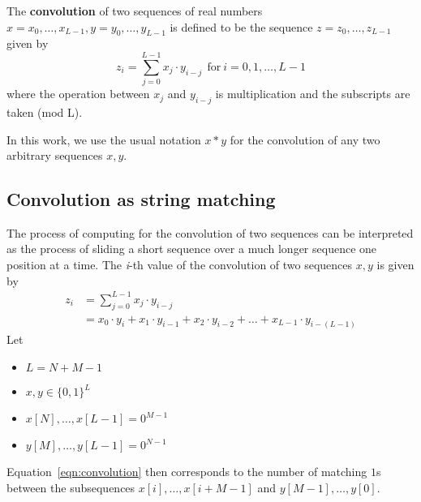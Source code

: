\begin{definition}
	\label{def:convolution}
	The \textbf{convolution} of two sequences of real numbers $x=x_0,\ldots,x_{L-1}, y=y_0,\ldots,y_{L-1}$ is defined to be the sequence $z=z_0,\ldots,z_{L-1}$ given by
	\begin{equation}\label{eqn:convolution}
		z_{i} = \sum_{j=0}^{L-1} x_j \cdot y_{i-j}\ \ \text{for}\ i = 0, 1, \ldots, L-1
	\end{equation}
	where the operation between $x_j$ and $y_{i-j}$ is multiplication and the subscripts are taken (\textrm{mod} L).
\end{definition}
In this work, we use the usual notation $x \ast y$ for the convolution of any two arbitrary sequences $x, y$.

\subsection{Convolution as string matching}
The process of computing for the convolution of two sequences can be interpreted as the process of sliding a short sequence over a much longer sequence one position at a time. The \textit{i}-th value of the convolution of two sequences $x, y$ is given by
\begin{align*}
	z_{i} &= \sum_{j=0}^{L-1} x_j \cdot y_{i-j}\\
	        &= x_{0}\cdot y_{i} + x_{1}\cdot y_{i-1} + x_{2}\cdot y_{i-2} + \ldots + x_{L-1}\cdot y_{i-(L-1)}
\end{align*}
Let
\begin{itemize}
    \item $L=N+M-1$
    \item $x, y \in \{0,1\}^L$
    \item $x[N],\ldots,x[L-1]=0^{M-1}$
    \item $y[M],\ldots,y[L-1]=0^{N-1}$
\end{itemize}
Equation~\ref{eqn:convolution} then corresponds to the number of matching $1$s between the subsequences $x[i],\ldots,x[i+M-1]$ and $y[M-1],\ldots,y[0]$.

